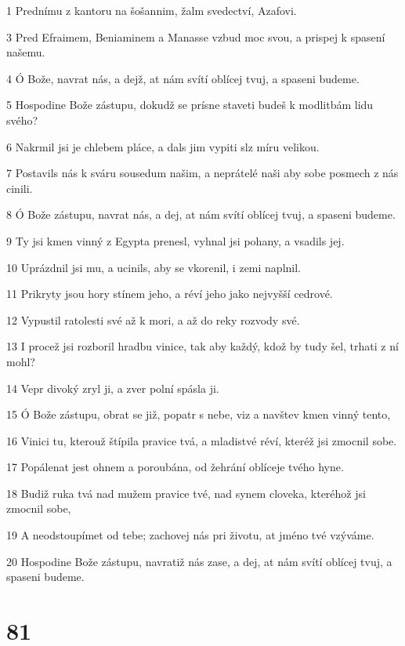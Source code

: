 \par 1 Prednímu z kantoru na šošannim, žalm svedectví, Azafovi.
\par 3 Pred Efraimem, Beniaminem a Manasse vzbud moc svou, a prispej k spasení našemu.
\par 4 Ó Bože, navrat nás, a dejž, at nám svítí oblícej tvuj, a spaseni budeme.
\par 5 Hospodine Bože zástupu, dokudž se prísne staveti budeš k modlitbám lidu svého?
\par 6 Nakrmil jsi je chlebem pláce, a dals jim vypiti slz míru velikou.
\par 7 Postavils nás k sváru sousedum našim, a neprátelé naši aby sobe posmech z nás cinili.
\par 8 Ó Bože zástupu, navrat nás, a dej, at nám svítí oblícej tvuj, a spaseni budeme.
\par 9 Ty jsi kmen vinný z Egypta prenesl, vyhnal jsi pohany, a vsadils jej.
\par 10 Uprázdnil jsi mu, a ucinils, aby se vkorenil, i zemi naplnil.
\par 11 Prikryty jsou hory stínem jeho, a réví jeho jako nejvyšší cedrové.
\par 12 Vypustil ratolesti své až k mori, a až do reky rozvody své.
\par 13 I procež jsi rozboril hradbu vinice, tak aby každý, kdož by tudy šel, trhati z ní mohl?
\par 14 Vepr divoký zryl ji, a zver polní spásla ji.
\par 15 Ó Bože zástupu, obrat se již, popatr s nebe, viz a navštev kmen vinný tento,
\par 16 Vinici tu, kterouž štípila pravice tvá, a mladistvé réví, kteréž jsi zmocnil sobe.
\par 17 Popálenat jest ohnem a poroubána, od žehrání oblíceje tvého hyne.
\par 18 Budiž ruka tvá nad mužem pravice tvé, nad synem cloveka, kteréhož jsi zmocnil sobe,
\par 19 A neodstoupímet od tebe; zachovej nás pri životu, at jméno tvé vzýváme.
\par 20 Hospodine Bože zástupu, navratiž nás zase, a dej, at nám svítí oblícej tvuj, a spaseni budeme.

\chapter{81}


